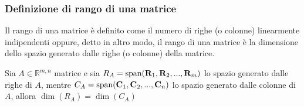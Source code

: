     \vspace{10pt}
    \subsubsection{Definizione di rango di una matrice} \label{subsubsec:matrankdef}
    Il rango di una matrice è definito come il numero di righe (o colonne) linearmente indipendenti oppure, detto in altro modo, il rango di una matrice è la dimensione dello spazio generato dalle righe (o colonne) della matrice.

    \vspace{10pt}
    \begin{theorem}
        Sia $A \in \mathbb{R}^{m, n}$ matrice e sia $R_A = \textnormal{span}(\mathbf{R}_{1}, \mathbf{R}_{2}, ..., \mathbf{R}_{m})$ lo spazio generato dalle righe di $A$, mentre $C_A = \textnormal{span}(\mathbf{C}_{1}, \mathbf{C}_{2}, ..., \mathbf{C}_{n})$ lo spazio
        generato dalle colonne di $A$, allora $\dim(R_A) = \dim(C_A)$
    \end{theorem}

